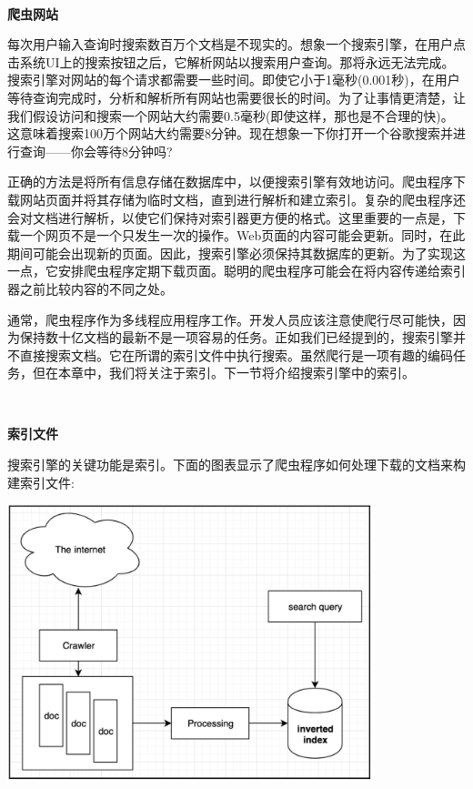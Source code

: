 \noindent\textbf{}\ \par
\textbf{爬虫网站} \ \par
每次用户输入查询时搜索数百万个文档是不现实的。想象一个搜索引擎，在用户点击系统UI上的搜索按钮之后，它解析网站以搜索用户查询。那将永远无法完成。搜索引擎对网站的每个请求都需要一些时间。即使它小于1毫秒(0.001秒)，在用户等待查询完成时，分析和解析所有网站也需要很长的时间。为了让事情更清楚，让我们假设访问和搜索一个网站大约需要0.5毫秒(即使这样，那也是不合理的快)。这意味着搜索100万个网站大约需要8分钟。现在想象一下你打开一个谷歌搜索并进行查询——你会等待8分钟吗? \par
正确的方法是将所有信息存储在数据库中，以便搜索引擎有效地访问。爬虫程序下载网站页面并将其存储为临时文档，直到进行解析和建立索引。复杂的爬虫程序还会对文档进行解析，以使它们保持对索引器更方便的格式。这里重要的一点是，下载一个网页不是一个只发生一次的操作。Web页面的内容可能会更新。同时，在此期间可能会出现新的页面。因此，搜索引擎必须保持其数据库的更新。为了实现这一点，它安排爬虫程序定期下载页面。聪明的爬虫程序可能会在将内容传递给索引器之前比较内容的不同之处。 \par
通常，爬虫程序作为多线程应用程序工作。开发人员应该注意使爬行尽可能快，因为保持数十亿文档的最新不是一项容易的任务。正如我们已经提到的，搜索引擎并不直接搜索文档。它在所谓的索引文件中执行搜索。虽然爬行是一项有趣的编码任务，但在本章中，我们将关注于索引。下一节将介绍搜索引擎中的索引。 \par

\noindent\textbf{}\ \par
\textbf{索引文件} \ \par
搜索引擎的关键功能是索引。下面的图表显示了爬虫程序如何处理下载的文档来构建索引文件: \par

\begin{center}
	\includegraphics[width=0.8\textwidth]{content/Section-3/Chapter-16/7}
\end{center}

